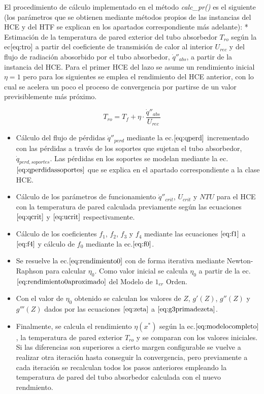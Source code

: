 El procedimiento de cálculo implementado en el método \emph{calc\_pr()}
es el siguiente (los parámetros que se obtienen mediante métodos propios
de las instancias del HCE y del HTF se explican en los apartados
correspondiente más adelante): * Estimación de la temperatura de pared
exterior del tubo absorbedor \(T_{ro}\) según la ec\(\eqref{eq:tro}\) a
partir del coeficiente de transmisión de calor al interior \(U_{rec}\) y
del flujo de radiación abosorbido por el tubo absorbedor,
\(\dot q''_{abs}\), a partir de la instancia del HCE. Para el primer HCE
del lazo se asume un rendimiento inicial \(\eta=1\) pero para los
siguientes se emplea el rendimiento del HCE anterior, con lo cual se
acelera un poco el proceso de convergencia por partirse de un valor
previsiblemente más próximo.

\begin{equation}
    T_{ro} = T_f + \eta \cdot \frac{\dot q''_{abs}}{U_{rec}}
    \label{eq:tro}
\end{equation}

\begin{itemize}
\tightlist
\item
  Cálculo del flujo de pérdidas \(\dot q''_{perd}\) mediante la
  ec.\(\eqref{eq:qperd}\) incrementado con las pérdidas a través de los
  soportes que sujetan el tubo absorbedor, \(\dot q_{perd,soportes}\).
  Las pérdidas en los soportes se modelan mediante la
  ec.\(\eqref{eq:qperdidassoportes}\) que se explica en el apartado
  correspondiente a la clase HCE.
\item
  Cálculo de los parámetros de funcionamiento \(\dot q''_{crit}\),
  \(U_{crit}\) y \(NTU\) para el HCE con la temperatura de pared
  calculada previamente según las ecuaciones \(\eqref{eq:qcrit}\) y
  \(\eqref{eq:ucrit}\) respectivamente.
\item
  Cálculo de los coeficientes \(f_1\), \(f_2\), \(f_3\) y \(f_4\)
  mediante las ecuaciones \(\eqref{eq:f1}\) a \(\eqref{eq:f4}\) y
  cálculo de \(f_0\) mediante la ec.\(\eqref{eq:f0}\).
\item
  Se resuelve la ec.\(\eqref{eq:rendimiento0}\) con de forma iterativa
  mediante Newton-Raphson para calcular \(\eta_0\). Como valor inicial
  se calcula \(\eta_0\) a partir de la
  ec.\(\eqref{eq:rendimiento0aproximado}\) del Modelo de \(1_{er}\)
  Orden.
\item
  Con el valor de \(\eta_0\) obtenido se calculan los valores de \(Z\),
  \(g'(Z)\), \(g''(Z)\) y \(g'''(Z)\) dados por las ecuaciones
  \(\eqref{eq:zeta}\) a \(\eqref{eq:g3primadezeta}\).
\item
  Finalmente, se calcula el rendimiento \(\eta(x^*)\) según la
  ec.\(\eqref{eq:modelocompleto}\), la temperatura de pared exterior
  \(T_{ro}\) y se comparan con los valores iniciales. Si las diferencias
  son superiores a cierto margen configurable se vuelve a realizar otra
  iteración hasta conseguir la convergencia, pero previamente a cada
  iteración se recalculan todos los pasos anteriores empleando la
  temperatura de pared del tubo absorbedor calculada con el nuevo
  rendmiento.
\end{itemize}

